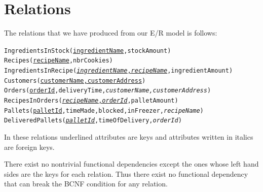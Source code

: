 \documentclass[a4paper]{article}
\begin{document}
\section{Relations}
The relations that we have produced from our E/R model is follows:

\vspace{0.5cm}

\noindent \texttt{IngredientsInStock(\underline{ingredientName},stockAmount)} \\
\texttt{Recipes(\underline{recipeName},nbrCookies)} \\
\texttt{IngredientsInRecipe(\underline{\textit{ingredientName},\textit{recipeName}},ingredientAmount)} \\
\texttt{Customers(\underline{customerName,customerAddress})} \\
\texttt{Orders(\underline{orderId},deliveryTime,\textit{customerName,customerAddress})} \\
\texttt{RecipesInOrders(\underline{\textit{recipeName},\textit{orderId}},palletAmount)} \\
\texttt{Pallets(\underline{palletId},timeMade,blocked,inFreezer,\textit{recipeName})} \\
\texttt{DeliveredPallets(\underline{\textit{palletId}},timeOfDelivery,\textit{orderId})}

\vspace{0.5cm}
\noindent In these relations underlined attributes are keys and attributes written in italics are foreign keys.

There exist no nontrivial functional dependencies except the ones whose left hand sides are the keys for each relation. Thus there exist no functional dependency that can break the BCNF condition for any relation.
\end{document}
